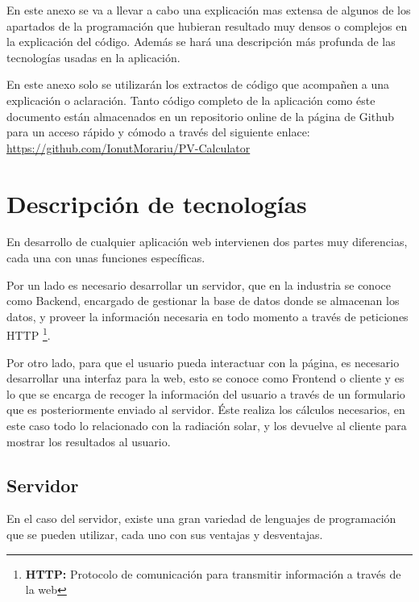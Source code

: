 En este anexo se va a llevar a cabo una explicación mas extensa de algunos de los apartados de la programación que hubieran resultado muy densos o complejos en la explicación del código. Además se hará una descripción más profunda de las tecnologías usadas en la aplicación.

En este anexo solo se utilizarán los extractos de código que acompañen a una explicación o aclaración. Tanto código completo de la aplicación como éste documento están almacenados en un repositorio online de la página de Github para un acceso rápido y cómodo a través del siguiente enlace: \url{https://github.com/IonutMorariu/PV-Calculator}

\section{Descripción de tecnologías}

En desarrollo de cualquier aplicación web intervienen dos partes muy diferencias, cada una con unas funciones específicas. 

Por un lado es necesario desarrollar un servidor, que en la industria se conoce como Backend, encargado de gestionar la base de datos donde se almacenan los datos, y proveer la información necesaria en todo momento a través de peticiones HTTP \footnote{ \textbf{HTTP:} Protocolo de comunicación para transmitir información a través de la web}.

Por otro lado, para que el usuario pueda interactuar con la página, es necesario desarrollar una interfaz para la web, esto se conoce como Frontend o cliente y es lo que se encarga de recoger la información del usuario a través de un formulario que es posteriormente enviado al servidor. Éste realiza los cálculos necesarios, en este caso todo lo relacionado con la radiación solar, y los devuelve al cliente para mostrar los resultados al usuario.

\subsection{Servidor}

En el caso del servidor, existe una gran variedad de lenguajes de programación que se pueden utilizar, cada uno con sus ventajas y desventajas.

